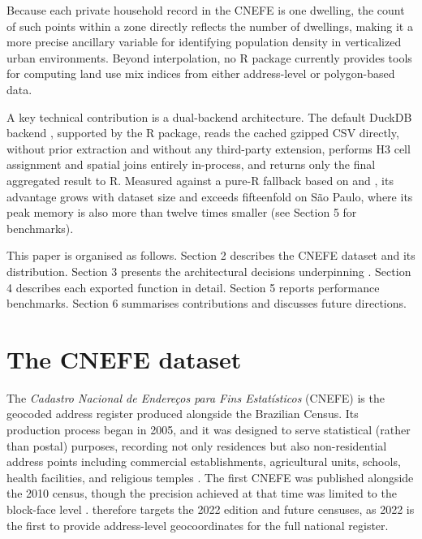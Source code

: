 Because each private household record in the CNEFE is one dwelling, the
count of such points within a zone directly reflects the number of
dwellings, making it a more precise
ancillary variable for identifying population density in verticalized
urban environments. Beyond interpolation, no R package currently
provides tools for computing land use mix indices from either
address-level or polygon-based data.

A key technical contribution is a dual-backend architecture. The default
DuckDB backend \citep{duckdb2019}, supported by the  R package,
reads the cached gzipped CSV directly, without prior extraction and
without any third-party extension, performs H3 cell assignment and
spatial joins entirely in-process, and returns only the final aggregated
result to R. Measured against a pure-R fallback based on
 \citep{h3jsr2023} and  \citep{pebesma2018}, its
advantage grows with dataset size and exceeds fifteenfold on São Paulo,
where its peak memory is also more than twelve times smaller (see
Section 5 for benchmarks).

This paper is organised as follows. Section 2 describes the CNEFE
dataset and its distribution. Section 3 presents the architectural
decisions underpinning . Section 4 describes each
exported function in detail. Section 5 reports performance benchmarks.
Section 6 summarises contributions and discusses future directions.

\section{The CNEFE dataset}\label{the-cnefe-dataset}

The \emph{Cadastro Nacional de Endereços para Fins Estatísticos} (CNEFE) is the
geocoded address register produced alongside the Brazilian Census.
Its production process began in 2005, and it was designed to serve
statistical (rather than postal) purposes, recording not only residences
but also non-residential address points including commercial
establishments, agricultural units, schools, health facilities, and
religious temples \citep{ibge_cnefe2024}. The first CNEFE was published
alongside the 2010 census, though the precision achieved at that time
was limited to the block-face level \citep{ibge_cnefe2024}.
 therefore targets the 2022 edition
and future censuses, as 2022 is the first to provide address-level
geocoordinates for the full national register.

